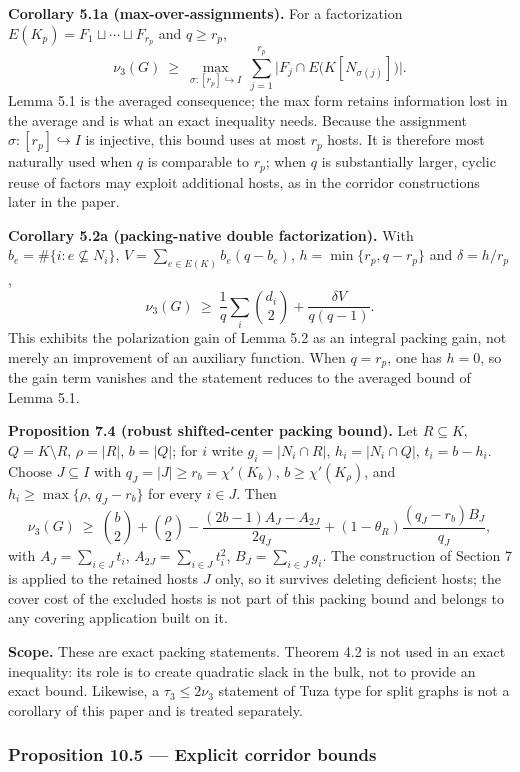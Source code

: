\documentclass[
  american,
  11pt,
  a4paper,
]{article}
\begin{document}
\textbf{Corollary 5.1a (max-over-assignments).} For a factorization \(E(K_p)=F_1\sqcup\cdots\sqcup F_{r_p}\) and \(q\ge r_p\), \[
\nu_3(G)\ \ge\ \max_{\sigma:[r_p]\hookrightarrow I}\ \sum_{j=1}^{r_p}\big|F_j\cap E\big(K[N_{\sigma(j)}]\big)\big|.
\] Lemma 5.1 is the averaged consequence; the max form retains information lost in the average and is what an exact inequality needs. Because the assignment \(\sigma:[r_p]\hookrightarrow I\) is injective, this bound uses at most \(r_p\) hosts. It is therefore most naturally used when \(q\) is comparable to \(r_p\); when \(q\) is substantially larger, cyclic reuse of factors may exploit additional hosts, as in the corridor constructions later in the paper.

\textbf{Corollary 5.2a (packing-native double factorization).} With \(b_e=\#\{i:e\not\subseteq N_i\}\), \(V=\sum_{e\in E(K)} b_e(q-b_e)\), \(h=\min\{r_p,q-r_p\}\) and \(\delta=h/r_p\), \[
\nu_3(G)\ \ge\ \frac1q\sum_i\binom{d_i}{2}+\frac{\delta V}{q(q-1)}.
\] This exhibits the polarization gain of Lemma 5.2 as an integral packing gain, not merely an improvement of an auxiliary function. When \(q=r_p\), one has \(h=0\), so the gain term vanishes and the statement reduces to the averaged bound of Lemma 5.1.

\textbf{Proposition 7.4 (robust shifted-center packing bound).} Let \(R\subseteq K\), \(Q=K\setminus R\), \(\rho=|R|\), \(b=|Q|\); for \(i\) write \(g_i=|N_i\cap R|\), \(h_i=|N_i\cap Q|\), \(t_i=b-h_i\). Choose \(J\subseteq I\) with \(q_J=|J|\ge r_b=\chi'(K_b)\), \(b\ge\chi'(K_\rho)\), and \(h_i\ge\max\{\rho,\,q_J-r_b\}\) for every \(i\in J\). Then \[
\nu_3(G)\ \ge\ \binom b2+\binom\rho2-\frac{(2b-1)A_J-A_{2J}}{2q_J}+(1-\theta_R)\frac{(q_J-r_b)B_J}{q_J},
\] with \(A_J=\sum_{i\in J}t_i\), \(A_{2J}=\sum_{i\in J}t_i^2\), \(B_J=\sum_{i\in J}g_i\). The construction of Section 7 is applied to the retained hosts \(J\) only, so it survives deleting deficient hosts; the cover cost of the excluded hosts is not part of this packing bound and belongs to any covering application built on it.

\textbf{Scope.} These are exact packing statements. Theorem 4.2 is not used in an exact inequality: its role is to create quadratic slack in the bulk, not to provide an exact bound. Likewise, a \(\tau_3\le2\nu_3\) statement of Tuza type for split graphs is not a corollary of this paper and is treated separately.

\subsubsection{Proposition 10.5 --- Explicit corridor bounds}\label{proposition-10.5-explicit-corridor-bounds}
\end{document}
